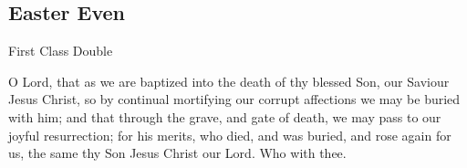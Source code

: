 \subsection{Easter Even}
\fancyhead[RE,LO]{}
\begin{inhead}
    {First Class Double}
\end{inhead}
    
\collect
{} O Lord, that as we are baptized into the death of thy blessed Son, our Saviour Jesus Christ, so by continual mortifying our corrupt affections we may be buried with him; and that through the grave, and gate of death, we may pass to our joyful resurrection; for his merits, who died, and was buried, and rose again for us, the same thy Son Jesus Christ our Lord. Who with thee.